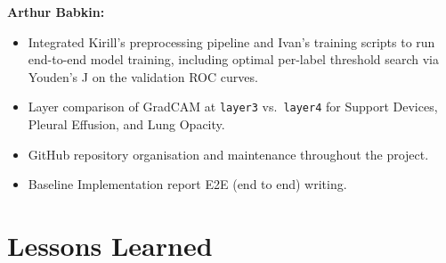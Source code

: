 \documentclass[12pt]{article}
\begin{document}
\textbf{Arthur Babkin:}
\begin{itemize}[leftmargin=*]
    \item Integrated Kirill's preprocessing pipeline and Ivan's training scripts to run end-to-end model training, including optimal per-label threshold search via Youden's J on the validation ROC curves.
    \item Layer comparison of GradCAM at \texttt{layer3} vs.\ \texttt{layer4} for Support Devices, Pleural Effusion, and Lung Opacity.
    \item GitHub repository organisation and maintenance throughout the project.
    \item Baseline Implementation report E2E (end to end) writing.
\end{itemize}

\section{Lessons Learned}
\end{document}
